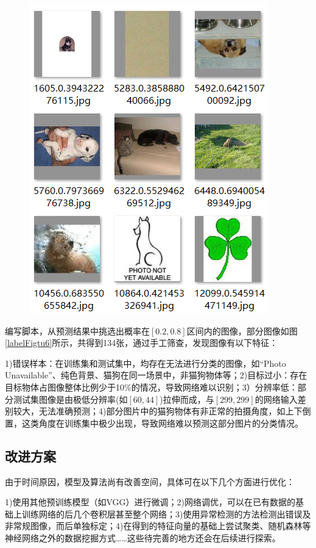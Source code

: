 \documentclass[10.5pt,twocolumn]{jbuaa}
\begin{document}
\begin{figure}[h!]
\centering
\includegraphics [scale=0.8,trim=0 0 0 0]{./image/low_acc.png}
\end{figure}

编写脚本，从预测结果中挑选出概率在$[0.2,0.8]$区间内的图像，部分图像如图\ref{labelFigtu6}所示，共得到134张，通过手工筛查，发现图像有以下特征：

1)错误样本：在训练集和测试集中，均存在无法进行分类的图像，如``Photo Unavailable''、纯色背景、猫狗在同一场景中，非猫狗物体等；2)目标过小：存在目标物体占图像整体比例少于10\%的情况，导致网络难以识别；3）分辨率低：部分测试集图像是由极低分辨率(如$[60,44]$)拉伸而成，与$[299,299]$的网络输入差别较大，无法准确预测；4)部分图片中的猫狗物体有非正常的拍摄角度，如上下倒置，这类角度在训练集中极少出现，导致网络难以预测这部分图片的分类情况。
\subsection{改进方案}
由于时间原因，模型及算法尚有改善空间，具体可在以下几个方面进行优化：

1)使用其他预训练模型（如VGG）进行微调；2)网络调优，可以在已有数据的基础上训练网络的后几个卷积层甚至整个网络；3)使用异常检测的方法检测出错误及非常规图像，而后单独标定；4)在得到的特征向量的基础上尝试聚类、随机森林等神经网络之外的数据挖掘方式……这些待完善的地方还会在后续进行探索。
\end{document}
